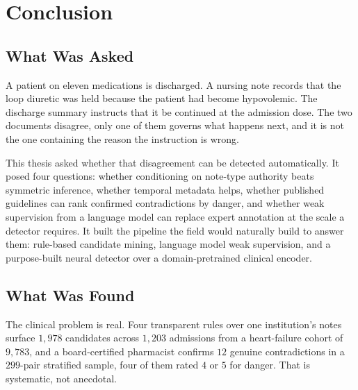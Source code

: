 %
%

\chapter{Conclusion}
\label{ch:conclusion}

\section{What Was Asked}
\label{sec:conc-asked}

A patient on eleven medications is discharged. A nursing note records that the
loop diuretic was held because the patient had become hypovolemic. The discharge
summary instructs that it be continued at the admission dose. The two documents
disagree, only one of them governs what happens next, and it is not the one
containing the reason the instruction is wrong.

This thesis asked whether that disagreement can be detected automatically. It
posed four questions: whether conditioning on note-type authority beats
symmetric inference, whether temporal metadata helps, whether published
guidelines can rank confirmed contradictions by danger, and whether weak
supervision from a language model can replace expert annotation at the scale a
detector requires. It built the pipeline the field would naturally build to
answer them: rule-based candidate mining, language model weak supervision, and a
purpose-built neural detector over a domain-pretrained clinical encoder.

\section{What Was Found}
\label{sec:conc-found}

The clinical problem is real. Four transparent rules over one institution's notes
surface $1{,}978$ candidates across $1{,}203$ admissions from a heart-failure
cohort of $9{,}783$, and a board-certified pharmacist confirms $12$ genuine
contradictions in a $299$-pair stratified sample, four of them rated $4$ or $5$
for danger. That is systematic, not anecdotal.

